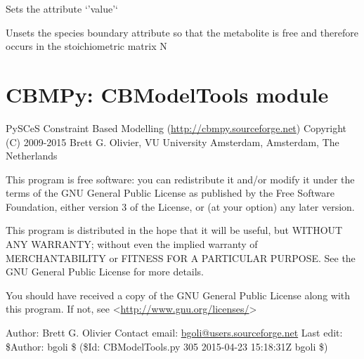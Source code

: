 \documentclass[a4paper,11pt,english]{sphinxmanual}
\begin{document}
\begin{fulllineitems}
\begin{fulllineitems}
\end{fulllineitems}


\begin{fulllineitems}
\label{modules_doc:cbmpy.CBModel.Species.setValue}
Sets the attribute `'value'`

\end{fulllineitems}


\begin{fulllineitems}
\label{modules_doc:cbmpy.CBModel.Species.unsetBoundary}
Unsets the species boundary attribute so that the metabolite is free and therefore occurs in the stoichiometric matrix N

\end{fulllineitems}


\end{fulllineitems}

\label{modules_doc:module-cbmpy.CBModelTools}

\section{CBMPy: CBModelTools module}
\label{modules_doc:cbmpy-cbmodeltools-module}
PySCeS Constraint Based Modelling (\href{http://cbmpy.sourceforge.net}{http://cbmpy.sourceforge.net})
Copyright (C) 2009-2015 Brett G. Olivier, VU University Amsterdam, Amsterdam, The Netherlands

This program is free software: you can redistribute it and/or modify
it under the terms of the GNU General Public License as published by
the Free Software Foundation, either version 3 of the License, or
(at your option) any later version.

This program is distributed in the hope that it will be useful,
but WITHOUT ANY WARRANTY; without even the implied warranty of
MERCHANTABILITY or FITNESS FOR A PARTICULAR PURPOSE.  See the
GNU General Public License for more details.

You should have received a copy of the GNU General Public License
along with this program.  If not, see \textless{}\href{http://www.gnu.org/licenses/}{http://www.gnu.org/licenses/}\textgreater{}

Author: Brett G. Olivier
Contact email: \href{mailto:bgoli@users.sourceforge.net}{bgoli@users.sourceforge.net}
Last edit: \$Author: bgoli \$ (\$Id: CBModelTools.py 305 2015-04-23 15:18:31Z bgoli \$)
\label{modules_doc:module-cbmpy.CBMultiCore}
\end{document}
